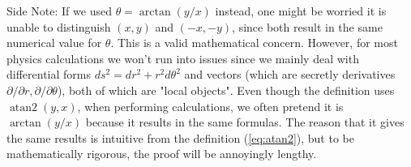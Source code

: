 \documentclass{article}
\begin{document}
Side Note: If we used $\theta = \arctan(y/x)$ instead, one might be worried it is unable to distinguish $(x,y)$ and $(-x,-y)$, since both result in the same numerical value for $\theta$. This is a valid mathematical concern. However, for most physics calculations we won't run into issues since we mainly deal with differential forms $ds^2 = dr^2 + r^2 d\theta^2$ and vectors (which are secretly derivatives $\partial/\partial r, \partial/\partial \theta$), both of which are "local objects". Even though the definition uses $\operatorname{atan2}(y,x)$, when performing calculations, we often pretend it is $\arctan(y/x)$ because it results in the same formulas. The reason that it gives the same results is intuitive from the definition (\ref{eq:atan2}), but to be mathematically rigorous, the proof will be annoyingly lengthy.
\end{document}

